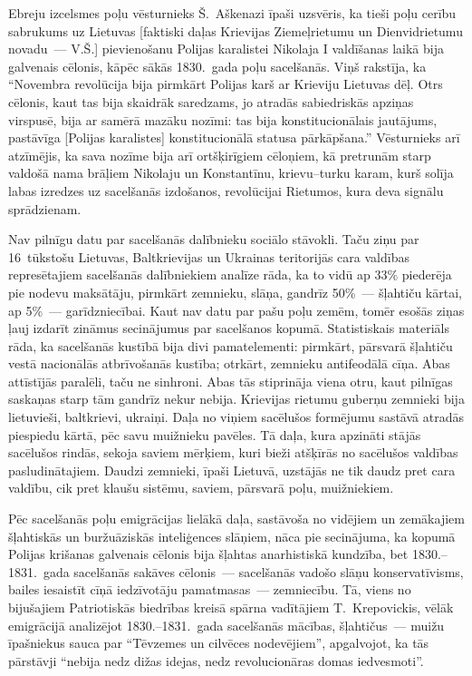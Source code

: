 \documentclass[twoside,a5paper,12pt,fleqn,openany]{extbook}
\begin{document}
Ebreju izcelsmes poļu vēsturnieks Š.~Aškenazi īpaši uzsvēris, ka tieši poļu cerību sabrukums uz Lietuvas [faktiski daļas Krievijas Ziemeļrietumu un Dienvidrietumu novadu~--- V.Š.] pievienošanu Polijas karalistei Nikolaja I valdīšanas laikā bija galvenais cēlonis, kāpēc sākās 1830.~gada poļu sacelšanās. Viņš rakstīja, ka ``Novembra revolūcija bija pirmkārt Polijas karš ar Krieviju Lietuvas dēļ. Otrs cēlonis, kaut tas bija skaidrāk saredzams, jo atradās sabiedriskās apziņas virspusē, bija ar samērā mazāku nozīmi: tas bija konstitucionālais jautājums, pastāvīga [Polijas karalistes] konstitucionālā statusa pārkāpšana.'' Vēsturnieks arī atzīmējis, ka sava nozīme bija arī ortšķirīgiem cēloņiem, kā pretrunām starp valdošā nama brāļiem Nikolaju un Konstantīnu, krievu--turku karam, kurš solīja labas izredzes uz sacelšanās izdošanos, revolūcijai Rietumos, kura deva signālu sprādzienam.

Nav pilnīgu datu par sacelšanās dalībnieku sociālo stāvokli. Taču ziņu par 16~tūkstošu Lietuvas, Baltkrievijas un Ukrainas teritorijās cara valdības represētajiem sacelšanās dalībniekiem analīze rāda, ka to vidū ap 33\% piederēja pie nodevu maksātāju, pirmkārt zemnieku, slāņa, gandrīz 50\%~--- šļahtiču kārtai, ap 5\%~--- garīdzniecībai. Kaut nav datu par pašu poļu zemēm, tomēr esošās ziņas ļauj izdarīt zināmus secinājumus par sacelšanos kopumā. Statistiskais materiāls rāda, ka sacelšanās kustībā bija divi pamatelementi: pirmkārt, pārsvarā šļahtiču vestā nacionālās atbrīvošanās kustība; otrkārt, zemnieku antifeodālā cīņa. Abas attīstījās paralēli, taču ne sinhroni. Abas tās stiprināja viena otru, kaut pilnīgas saskaņas starp tām gandrīz nekur nebija. Krievijas rietumu guberņu zemnieki bija lietuvieši, baltkrievi, ukraiņi. Daļa no viņiem sacēlušos formējumu sastāvā atradās piespiedu kārtā, pēc savu muižnieku pavēles. Tā daļa, kura apzināti stājās sacēlušos rindās, sekoja saviem mērķiem, kuri bieži atšķīrās no sacēlušos valdības pasludinātajiem. Daudzi zemnieki, īpaši Lietuvā, uzstājās ne tik daudz pret cara valdību, cik pret klaušu sistēmu, saviem, pārsvarā poļu, muižniekiem.

Pēc sacelšanās poļu emigrācijas lielākā daļa, sastāvoša no vidējiem un zemākajiem šļahtiskās un buržuāziskās inteliģences slāņiem, nāca pie secinājuma, ka kopumā Polijas krišanas galvenais cēlonis bija šļahtas anarhistiskā kundzība, bet 1830.--1831.~gada sacelšanās sakāves cēlonis~--- sacelšanās vadošo slāņu konservatīvisms, bailes iesaistīt cīņā iedzīvotāju pamatmasas~--- zemniecību. Tā, viens no bijušajiem Patriotiskās biedrības kreisā spārna vadītājiem T.~Krepovickis, vēlāk emigrācijā analizējot 1830.--1831.~gada sacelšanās mācības, šļahtičus~--- muižu īpašniekus sauca par ``Tēvzemes un cilvēces nodevējiem'', apgalvojot, ka tās pārstāvji ``nebija nedz dižas idejas, nedz revolucionāras domas iedvesmoti''.
\end{document}
